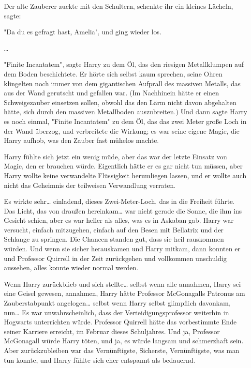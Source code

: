 {Der alte Zauberer zuckte mit den Schultern, schenkte ihr ein kleines Lächeln, sagte:

"Da du es gefragt hast, Amelia", und ging wieder los.

…

"Finite Incantatem", sagte Harry zu dem Öl, das den riesigen Metallklumpen auf dem Boden beschichtete. Er hörte sich selbst kaum sprechen, seine Ohren klingelten noch immer von dem gigantischen Aufprall des massiven Metalls, das aus der Wand gerutscht und gefallen war. (Im Nachhinein hätte er einen Schweigezauber einsetzen sollen, obwohl das den Lärm nicht davon abgehalten hätte, sich durch den massiven Metallboden auszubreiten.) Und dann sagte Harry es noch einmal, "Finite Incantatem" zu dem Öl, das das zwei Meter große Loch in der Wand überzog, und verbreitete die Wirkung; es war seine eigene Magie, die Harry aufhob, was den Zauber fast mühelos machte.

Harry fühlte sich jetzt ein wenig müde, aber das war der letzte Einsatz von Magie, den er brauchen würde. Eigentlich hätte er es gar nicht tun müssen, aber Harry wollte keine verwandelte Flüssigkeit herumliegen lassen, und er wollte auch nicht das Geheimnis der teilweisen Verwandlung verraten.

Es wirkte sehr… einladend, dieses Zwei-Meter-Loch, das in die Freiheit führte. Das Licht, das von draußen hereinkam… war nicht gerade die Sonne, die ihm ins Gesicht schien, aber es war heller als alles, was es in Askaban gab. Harry war versucht, einfach mitzugehen, einfach auf den Besen mit Bellatrix und der Schlange zu springen. Die Chancen standen gut, dass sie heil rauskommen würden. Und wenn sie sicher herauskamen und Harry mitkam, dann konnten er und Professor Quirrell in der Zeit zurückgehen und vollkommen unschuldig aussehen, alles konnte wieder normal werden.

Wenn Harry zurückblieb und sich stellte… selbst wenn alle annahmen, Harry sei eine Geisel gewesen, annahmen, Harry hätte Professor McGonagalls Patronus am Zauberstabpunkt angelogen… selbst wenn Harry selbst glimpflich davonkam, nun… Es war unwahrscheinlich, dass der Verteidigungsprofessor weiterhin in Hogwarts unterrichten würde. Professor Quirrell hätte das vorbestimmte Ende seiner Karriere erreicht, im Februar dieses Schuljahres. Und ja, Professor McGonagall würde Harry töten, und ja, es würde langsam und schmerzhaft sein. Aber zurückzubleiben war das Vernünftigste, Sicherste, Vernünftigste, was man tun konnte, und Harry fühlte sich eher entspannt als bedauernd.

}
